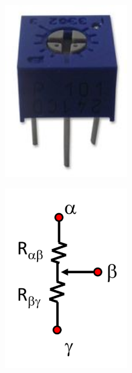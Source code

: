 \begin{minipage}[c]{0.45\textwidth}
	\centering
	\includegraphics[width=0.4\textwidth]{figures/potentiometre_picture.jpg}
	\label{fig:potentiometre_pic}
\end{minipage}
\hfill
\begin{minipage}[c]{0.45\textwidth}
	\centering
	\includegraphics[width=0.4\textwidth]{figures/potentiometre.pdf}
	\label{fig:potentiometre_sch}
\end{minipage}
\vspace{1cm}